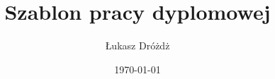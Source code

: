 \documentclass[a4paper, 12pt, twoside, polish]{thesis}
\title{Szablon pracy dyplomowej}         %
\author{Łukasz Dróżdż}                   %
\date{\today}                            %
\begin{document}
\maketitle                               %
\preface                                 %
\body                                    %
\appendix                                %
\end{document}
